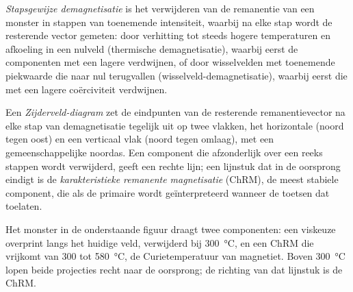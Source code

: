 \begin{definition}\label{def:b3:palaeomagnetism:demag}
\emph{Stapsgewijze demagnetisatie} is het verwijderen
van de remanentie van een monster in stappen van toenemende intensiteit, waarbij
na elke stap wordt de resterende vector gemeten: door verhitting tot steeds hogere
temperaturen en afkoeling in een nulveld (thermische demagnetisatie), waarbij eerst
de componenten met een lagere  verdwijnen, of door wisselvelden
met toenemende piekwaarde die naar nul terugvallen (wisselveld-demagnetisatie), waarbij
eerst die met een lagere coërciviteit verdwijnen.
\end{definition}

\begin{definition}\label{def:b3:palaeomagnetism:zijderveld}
Een \emph{Zijderveld-diagram} zet de eindpunten van de
resterende remanentievector na elke stap van demagnetisatie tegelijk uit op twee vlakken,
het horizontale (noord tegen oost) en een verticaal vlak (noord tegen omlaag), met een
gemeenschappelijke noordas. Een component die afzonderlijk over een reeks stappen wordt
verwijderd, geeft een rechte lijn; een lijnstuk dat in de oorsprong eindigt is de
\emph{karakteristieke remanente magnetisatie}
(ChRM), de meest stabiele component, die als de primaire wordt geïnterpreteerd wanneer de toetsen
dat toelaten.
\end{definition}

Het monster in de onderstaande figuur draagt twee componenten: een viskeuze overprint
langs het huidige veld, verwijderd bij \qty{300}{\celsius}, en een ChRM die vrijkomt van
300 tot \qty{580}{\celsius}, de Curietemperatuur van magnetiet. Boven \qty{300}{\celsius}
lopen beide projecties recht naar de oorsprong; de
richting van dat lijnstuk is de ChRM.


